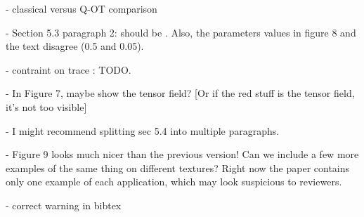 - classical versus Q-OT comparison

- Section 5.3 paragraph 2: \tau should be \rho. Also, the parameters values in figure 8 and the text disagree (0.5 and 0.05).

- contraint on trace : TODO.

- In Figure 7, maybe show the tensor field?  [Or if the red stuff is the tensor field, it's not too visible]

- I might recommend splitting sec 5.4 into multiple paragraphs.

- Figure 9 looks much nicer than the previous version!  Can we include a few more examples of the same thing on different textures?  Right now the paper contains only one example of each application, which may look suspicious to reviewers.

- correct warning in bibtex